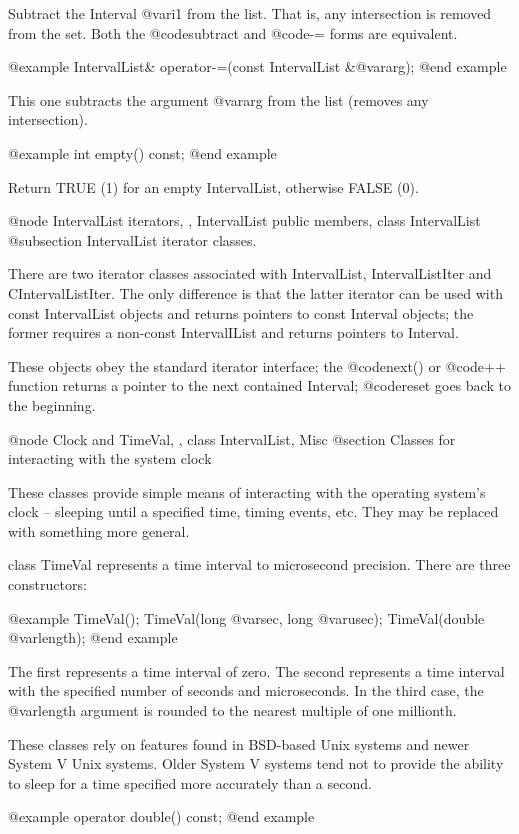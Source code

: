 Subtract the Interval @var{i1} from the list.  That is, any intersection
is removed from the set.  Both the @code{subtract} and @code{-=} forms
are equivalent.

@example
IntervalList& operator-=(const IntervalList &@var{arg});
@end example

This one subtracts the argument @var{arg} from the list (removes any
intersection).

@example
int empty() const;
@end example

Return TRUE (1) for an empty IntervalList, otherwise FALSE (0).

@node IntervalList iterators,  , IntervalList public members, class IntervalList
@subsection IntervalList iterator classes.

There are two iterator classes associated with IntervalList,
IntervalListIter and CIntervalListIter.  The only difference is that
the latter iterator can be used with const IntervalList objects and
returns pointers to const Interval objects; the former requires a
non-const IntervalIList and returns pointers to Interval.

These objects obey the standard iterator interface; the @code{next()}
or @code{++} function returns a pointer to the next contained Interval;
@code{reset} goes back to the beginning.

@node Clock and TimeVal,  , class IntervalList, Misc
@section Classes for interacting with the system clock

These classes provide simple means of interacting with the operating
system's clock -- sleeping until a specified time, timing events, etc.
They may be replaced with something more general.

class TimeVal represents a time interval to microsecond precision.
There are three constructors:

@example
TimeVal();
TimeVal(long @var{sec}, long @var{usec});
TimeVal(double @var{length});
@end example

The first represents a time interval of zero.  The second represents a
time interval with the specified number of seconds and microseconds.
In the third case, the @var{length} argument is rounded to the nearest
multiple of one millionth.

These classes rely on features found in BSD-based Unix systems and newer
System V Unix systems.  Older System V systems tend not to provide the
ability to sleep for a time specified more accurately than a second.

@example
operator double() const;
@end example

